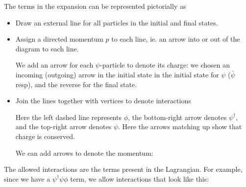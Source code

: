 \documentclass[a4paper]{article}
\begin{document}
The terms in the expansion can be represented pictorially as
\begin{itemize}
  \item Draw an external line for all particles in the initial and final states.
  \item Assign a directed momentum $p$ to each line, ie. an arrow into or out of the diagram to each line.

    We add an arrow for each $\psi$-particle to denote its charge: we chosen an incoming (outgoing) arrow in the initial state in the initial state for $\psi$ ($\bar{\psi}$ resp), and the reverse for the final state.
  \item Join the lines together with vertices to denote interactions
    \begin{center}
    \end{center}
    Here the left dashed line represents $\phi$, the bottom-right arrow denotes $\psi^\dagger$, and the top-right arrow denotes $\psi$. Here the arrows matching up show that charge is conserved.

    We can add arrows to denote the momentum:
    \begin{center}
    \end{center}
\end{itemize}
The allowed interactions are the terms present in the Lagrangian. For example, since we have a $\psi^\dagger\psi \phi$ term, we allow interactions that look like this:
\end{document}
